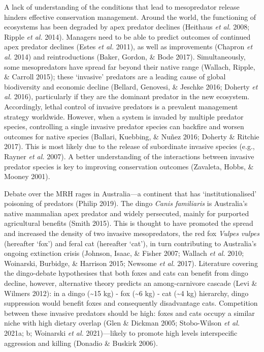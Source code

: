 \documentclass[11pt,a4paper,titlepage,twoside,openright]{style/unimelbthesis}
\begin{document}
\begin{mainmatter}
A lack of understanding of the conditions that lead to mesopredator release hinders effective conservation management. Around the world, the functioning of ecosystems has been degraded by apex predator declines (Heithaus \emph{et al.} 2008; Ripple \emph{et al.} 2014). Managers need to be able to predict outcomes of continued apex predator declines (Estes \emph{et al.} 2011), as well as improvements (Chapron \emph{et al.} 2014) and reintroductions (Baker, Gordon, \& Bode 2017). Simultaneously, some mesopredators have spread far beyond their native range (Wallach, Ripple, \& Carroll 2015); these `invasive' predators are a leading cause of global biodiversity and economic decline (Bellard, Genovesi, \& Jeschke 2016; Doherty \emph{et al.} 2016), particularly if they are the dominant predator in the new ecosystem. Accordingly, lethal control of invasive predators is a prevalent management strategy worldwide. However, when a system is invaded by multiple predator species, controlling a single invasive predator species can backfire and worsen outcomes for native species (Ballari, Kuebbing, \& Nuñez 2016; Doherty \& Ritchie 2017). This is most likely due to the release of subordinate invasive species (e.g., Rayner \emph{et al.} 2007). A better understanding of the interactions between invasive predator species is key to improving conservation outcomes (Zavaleta, Hobbs, \& Mooney 2001).

Debate over the MRH rages in Australia---a continent that has `institutionalised' poisoning of predators (Philip 2019). The dingo \emph{Canis familiaris} is Australia's native mammalian apex predator and widely persecuted, mainly for purported agricultural benefits (Smith 2015). This is thought to have promoted the spread and increased the density of two invasive mesopredators, the red fox \emph{Vulpes vulpes} (hereafter `fox') and feral cat (hereafter `cat'), in turn contributing to Australia's ongoing extinction crisis (Johnson, Isaac, \& Fisher 2007; Wallach \emph{et al.} 2010; Woinarski, Burbidge, \& Harrison 2015; Newsome \emph{et al.} 2017). Literature covering the dingo-debate hypothesises that both foxes and cats can benefit from dingo decline, however, alternative theory predicts an among-carnivore cascade (Levi \& Wilmers 2012): in a dingo (\textasciitilde15 kg) - fox (\textasciitilde6 kg) - cat (\textasciitilde4 kg) hierarchy, dingo suppression would benefit foxes and consequently disadvantage cats. Competition between these invasive predators should be high: foxes and cats occupy a similar niche with high dietary overlap (Glen \& Dickman 2005; Stobo-Wilson \emph{et al.} 2021a; b; Woinarski \emph{et al.} 2021)---likely to promote high levels interspecific aggression and killing (Donadio \& Buskirk 2006).


\end{mainmatter}
\end{document}
